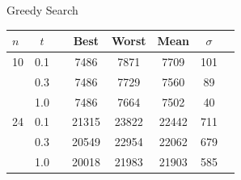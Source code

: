 \documentclass[10pt, conference, compsocconf]{IEEEtran}
\begin{document}


\newpage
\begin{center}
Greedy Search\\
\begin{tabular}{l*{6}{c}r}
$n$&$t$    &\vline&  Best & Worst &  Mean & $\sigma$\\
\hline
\hline
10 & 0.1   &\vline&  7486 &  7871 &  7709 & 101 \\
   & 0.3   &\vline&  7486 &  7729 &  7560 & 89 \\
   & 1.0   &\vline&  7486 &  7664 &  7502 & 40 \\
\hline 
24 & 0.1   &\vline& 21315 & 23822 & 22442 & 711 \\
   & 0.3   &\vline& 20549 & 22954 & 22062 & 679 \\
   & 1.0   &\vline& 20018 & 21983 & 21903 & 585 \\
\end{tabular}
\end{center}
\end{document}
